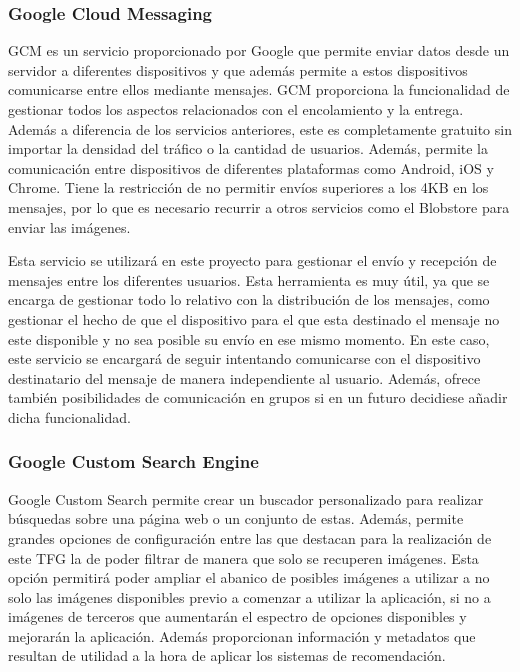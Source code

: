 \subsubsection{Google Cloud Messaging}
\ac{GCM} es un servicio proporcionado por Google que permite enviar datos desde un servidor a diferentes dispositivos y que además permite a estos dispositivos comunicarse entre ellos mediante mensajes. \ac{GCM} proporciona la funcionalidad de gestionar todos los aspectos relacionados con el encolamiento y la entrega. Además a diferencia de los servicios anteriores, este es completamente gratuito sin importar la densidad del tráfico o la cantidad de usuarios. Además, permite la comunicación entre dispositivos de diferentes plataformas como Android, iOS y Chrome. Tiene la restricción de no permitir envíos superiores a los 4KB en los mensajes, por lo que es necesario recurrir a otros servicios como el Blobstore para enviar las imágenes.

Esta servicio se utilizará en este proyecto para gestionar el envío y recepción de mensajes entre los diferentes usuarios. Esta herramienta es muy útil, ya que se encarga de gestionar todo lo relativo con la distribución de los mensajes, como gestionar el hecho de que el dispositivo para el que esta destinado el mensaje no este disponible y no sea posible su envío en ese mismo momento. En este caso, este servicio se encargará de seguir intentando comunicarse con el dispositivo destinatario del mensaje de manera independiente al usuario. Además, ofrece también posibilidades de comunicación en grupos si en un futuro decidiese añadir dicha funcionalidad.

\subsubsection{Google Custom Search Engine}

Google Custom Search \cite{GCSearch} permite crear un buscador personalizado para realizar búsquedas sobre una página web o un conjunto de estas. Además, permite grandes opciones de configuración entre las que destacan para la realización de este \ac{TFG} la de poder filtrar de manera que solo se recuperen imágenes. Esta opción permitirá poder ampliar el abanico de posibles imágenes a utilizar a no solo las imágenes disponibles previo a comenzar a utilizar la aplicación, si no a imágenes de terceros que aumentarán el espectro de opciones disponibles y mejorarán la aplicación. Además proporcionan información y metadatos que resultan de utilidad a la hora de aplicar los sistemas de recomendación.

